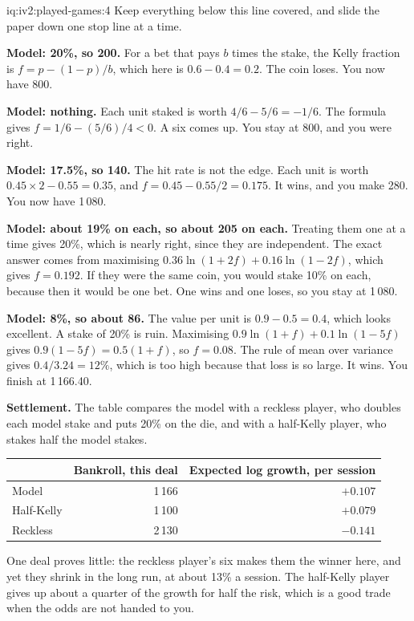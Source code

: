 \begin{solution}{iq:iv2:played-games:4}
Keep everything below this line covered, and slide the paper down one stop line at a time.

\ivstop
\textbf{Model: 20\%, so 200.} For a bet that pays $b$ times the stake, the Kelly fraction is $f = p - (1 - p)/b$, which here is $0.6 - 0.4 = 0.2$. The coin loses. You now have 800.

\ivstop
\textbf{Model: nothing.} Each unit staked is worth $4/6 - 5/6 = -1/6$. The formula gives $f = 1/6 - (5/6)/4 < 0$. A six comes up. You stay at 800, and you were right.

\ivstop
\textbf{Model: 17.5\%, so 140.} The hit rate is not the edge. Each unit is worth $0.45 \times 2 - 0.55 = 0.35$, and $f = 0.45 - 0.55/2 = 0.175$. It wins, and you make 280. You now have 1\,080.

\ivstop
\textbf{Model: about 19\% on each, so about 205 on each.} Treating them one at a time gives 20\%, which is nearly right, since they are independent. The exact answer comes from maximising $0.36\ln(1 + 2f) + 0.16\ln(1 - 2f)$, which gives $f = 0.192$. If they were the same coin, you would stake 10\% on each, because then it would be one bet. One wins and one loses, so you stay at 1\,080.

\ivstop
\textbf{Model: 8\%, so about 86.} The value per unit is $0.9 - 0.5 = 0.4$, which looks excellent. A stake of 20\% is ruin. Maximising $0.9\ln(1 + f) + 0.1\ln(1 - 5f)$ gives $0.9(1 - 5f) = 0.5(1 + f)$, so $f = 0.08$. The rule of mean over variance gives $0.4/3.24 = 12\%$, which is too high because that loss is so large. It wins. You finish at 1\,166.40.

\medskip
\textbf{Settlement.} The table compares the model with a reckless player, who doubles each model stake and puts 20\% on the die, and with a half-Kelly player, who stakes half the model stakes.
\begin{center}\small
\begin{tabular}{@{}lrr@{}}
 & Bankroll, this deal & Expected log growth, per session \\ \hline
Model & 1\,166 & $+0.107$ \\
Half-Kelly & 1\,100 & $+0.079$ \\
Reckless & 2\,130 & $-0.141$
\end{tabular}
\end{center}
One deal proves little: the reckless player's six makes them the winner here, and yet they shrink in the long run, at about 13\% a session. The half-Kelly player gives up about a quarter of the growth for half the risk, which is a good trade when the odds are not handed to you.


\end{solution}
